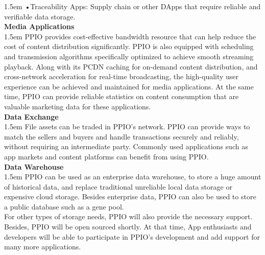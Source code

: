 \documentclass[10pt,a4paper]{article}
\begin{document}
\hangindent 1.5em
\noindent   
•\quad Traceability Apps: Supply chain or other DApps that require reliable and verifiable data storage.
  \vspace{-0.5em}
\\

\noindent 
 {\bf Media  Applications}
   \vspace{-0.8em}
\\

\hangindent 1.5em
\noindent 
PPIO provides cost-effective bandwidth resource that can help reduce the cost of content distribution significantly. PPIO is also equipped with scheduling and transmission algorithms specifically optimized to achieve smooth streaming playback. Along with its PCDN caching for on-demand content distribution, and cross-network acceleration for real-time broadcasting, the high-quality user experience can be achieved and maintained for media applications. At the same time, PPIO can provide reliable statistics on content consumption that are valuable marketing data for these applications.
  \vspace{-0.5em}
\\

\noindent 
 {\bf Data Exchange}
   \vspace{-0.8em}
\\

\hangindent 1.5em
\noindent 
 File assets can be traded in PPIO’s network. PPIO can provide ways to match the sellers and buyers and handle transactions securely and reliably, without requiring an intermediate party. Commonly used applications such as app markets and content platforms can benefit from using PPIO.
    \vspace{-0.5em}
\\

\noindent 
 {\bf Data Warehouse}
    \vspace{-0.5em}
\\

\hangindent 1.5em
\noindent 
PPIO can be used as an enterprise data warehouse, to store a huge amount of historical data, and replace traditional unreliable local data storage or expensive cloud storage. Besides enterprise data, PPIO can also be used to store a public database such as a gene pool.
   \vspace{-0.5em}
\\

\noindent 
For other types of storage needs, PPIO will also provide the necessary support. Besides, PPIO will be open sourced shortly. At that time, App enthusiasts and developers will be able to participate in PPIO's development and add support for many more applications.
   \vspace{-0.5em}
\end{document}
